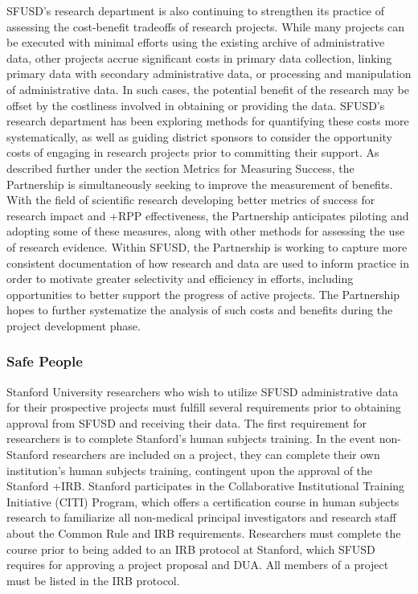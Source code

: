 \documentclass[
]{WileySix}
\begin{document}
SFUSD's research department is also continuing to strengthen its practice of assessing the cost-benefit tradeoffs of research projects. While many projects can be executed with minimal efforts using the existing archive of administrative data, other projects accrue significant costs in primary data collection, linking primary data with secondary administrative data, or processing and manipulation of administrative data. In such cases, the potential benefit of the research may be offset by the costliness involved in obtaining or providing the data. SFUSD's research department has been exploring methods for quantifying these costs more systematically, as well as guiding district sponsors to consider the opportunity costs of engaging in research projects prior to committing their support. As described further under the section Metrics for Measuring Success, the Partnership is simultaneously seeking to improve the measurement of benefits. With the field of scientific research developing better metrics of success for research impact and +RPP\textbar{} effectiveness, the Partnership anticipates piloting and adopting some of these measures, along with other methods for assessing the use of research evidence. Within SFUSD, the Partnership is working to capture more consistent documentation of how research and data are used to inform practice in order to motivate greater selectivity and efficiency in efforts, including opportunities to better support the progress of active projects. The Partnership hopes to further systematize the analysis of such costs and benefits during the project development phase.

\hypertarget{safe-people-5}{%
\subsubsection{Safe People}\label{safe-people-5}}

Stanford University researchers who wish to utilize SFUSD administrative data for their prospective projects must fulfill several requirements prior to obtaining approval from SFUSD and receiving their data. The first requirement for researchers is to complete Stanford's human subjects training. In the event non-Stanford researchers are included on a project, they can complete their own institution's human subjects training, contingent upon the approval of the Stanford +IRB\textbar. Stanford participates in the Collaborative Institutional Training Initiative (CITI) Program, which offers a certification course in human subjects research to familiarize all non-medical principal investigators and research staff about the Common Rule and IRB requirements. Researchers must complete the course prior to being added to an IRB protocol at Stanford, which SFUSD requires for approving a project proposal and DUA. All members of a project must be listed in the IRB protocol.
\end{document}
